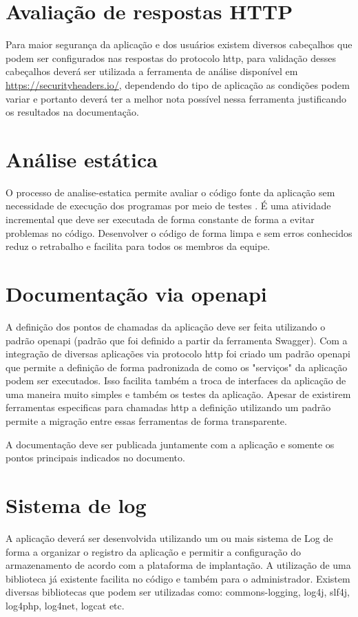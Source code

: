 \section{Avaliação de respostas HTTP}\label{atv-security-headers}
Para maior segurança da aplicação e dos usuários existem diversos cabeçalhos que podem ser configurados nas respostas do protocolo \ac{http}, para validação desses cabeçalhos deverá ser utilizada a ferramenta de análise disponível em \url{https://securityheaders.io/}, dependendo do tipo de aplicação as condições podem variar e portanto deverá ter a melhor nota possível nessa ferramenta justificando os resultados na documentação.

\section{Análise estática}\label{atv-analise-estatica}
O processo de \gls{analise-estatica} permite avaliar o código fonte da aplicação sem necessidade de execução dos programas por meio de testes . É uma atividade incremental que deve ser executada de forma constante de forma a evitar problemas no código. Desenvolver o código de forma limpa e sem erros conhecidos reduz o retrabalho e facilita para todos os membros da equipe.

\section{Documentação via \gls{openapi}}\label{atv-openapi}

A definição dos pontos de chamadas da aplicação deve ser feita utilizando o padrão \gls{openapi} (padrão que foi definido a partir da ferramenta Swagger). Com a integração de diversas aplicações via protocolo \ac{http} foi criado um padrão \gls{openapi} que permite a definição de forma padronizada de como os "serviços" da aplicação podem ser executados. Isso facilita também a troca de interfaces da aplicação de uma maneira muito simples e também os testes da aplicação. Apesar de existirem ferramentas especificas para chamadas \ac{http} a definição utilizando um padrão permite a migração entre essas ferramentas de forma transparente. 

A documentação deve ser publicada juntamente com a aplicação e somente os pontos principais indicados no documento.


\section{Sistema de log}\label{atv-log}
A aplicação deverá ser desenvolvida utilizando um ou mais sistema de Log de forma a organizar o registro da aplicação e permitir a configuração do armazenamento de acordo com a plataforma de implantação. A utilização de uma biblioteca já existente facilita no código e também para o administrador. Existem diversas bibliotecas que podem ser utilizadas como: commons-logging, log4j, slf4j, log4php, log4net, logcat etc.


